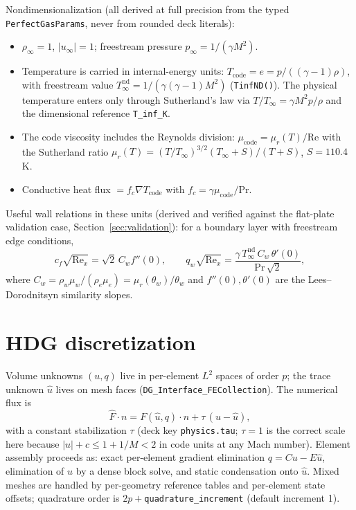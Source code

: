 \documentclass[11pt]{article}
\newcommand{\code}[1]{\texttt{#1}}
\newcommand{\uhat}{\hat{u}}
\begin{document}
Nondimensionalization (all derived at full precision from the typed
\code{PerfectGasParams}, never from rounded deck literals):
\begin{itemize}
  \item $\rho_\infty = 1$, $|u_\infty| = 1$; freestream pressure
        $p_\infty = 1/(\gamma M^2)$.
  \item Temperature is carried in internal-energy units:
        $T_{\mathrm{code}} = e = p /((\gamma-1)\rho)$, with freestream
        value $T_\infty^{\mathrm{nd}} = 1/(\gamma(\gamma-1)M^2)$
        (\code{TinfND()}). The physical temperature enters only through
        Sutherland's law via $T/T_\infty = \gamma M^2 p/\rho$ and the
        dimensional reference \code{T\_inf\_K}.
  \item The code viscosity includes the Reynolds division:
        $\mu_{\mathrm{code}} = \mu_r(T)/\mathrm{Re}$ with the Sutherland
        ratio $\mu_r(T) = (T/T_\infty)^{3/2}
        (T_\infty + S)/(T + S)$, $S = 110.4\,$K.
  \item Conductive heat flux $ = f_c \nabla T_{\mathrm{code}}$ with
        $f_c = \gamma \mu_{\mathrm{code}} / \mathrm{Pr}$.
\end{itemize}
Useful wall relations in these units (derived and verified against the
flat-plate validation case, Section~\ref{sec:validation}): for a
boundary layer with freestream edge conditions,
\begin{equation}
  c_f \sqrt{\mathrm{Re}_x} = \sqrt{2}\, C_w f''(0), \qquad
  q_w \sqrt{\mathrm{Re}_x} =
     \frac{\gamma\, T_\infty^{\mathrm{nd}}\, C_w\, \theta'(0)}
          {\mathrm{Pr}\,\sqrt{2}},
\end{equation}
where $C_w = \rho_w \mu_w / (\rho_e \mu_e) = \mu_r(\theta_w)/\theta_w$
and $f''(0), \theta'(0)$ are the Lees--Dorodnitsyn similarity slopes.

\section{HDG discretization}

Volume unknowns $(u, q)$ live in per-element $L^2$ spaces of order $p$;
the trace unknown $\uhat$ lives on mesh faces
(\code{DG\_Interface\_FECollection}). The numerical flux is
\begin{equation}
  \widehat F \cdot n = F(\uhat, q)\cdot n + \tau\,(u - \uhat),
\end{equation}
with a constant stabilization $\tau$ (deck key \code{physics.tau};
$\tau = 1$ is the correct scale here because $|u|+c \le 1 + 1/M < 2$ in
code units at any Mach number). Element assembly proceeds as: exact
per-element gradient elimination $q = C u - E \uhat$, elimination of $u$
by a dense block solve, and static condensation onto $\uhat$. Mixed
meshes are handled by per-geometry reference tables and per-element
state offsets; quadrature order is $2p + {}$\code{quadrature\_increment}
(default increment 1).
\end{document}
